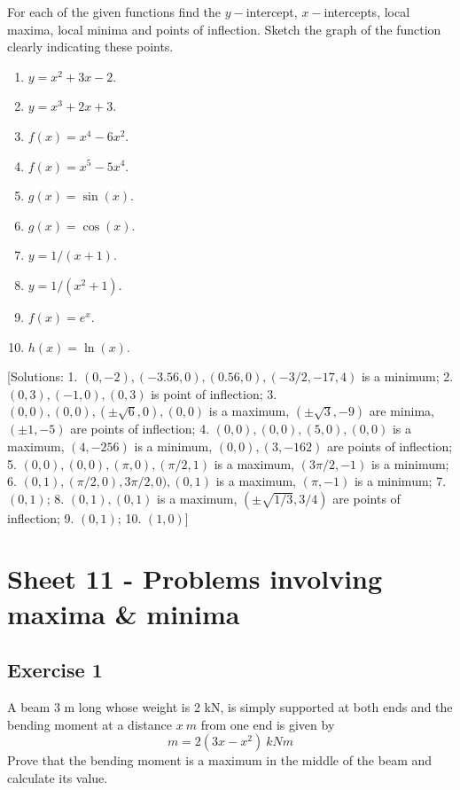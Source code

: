 \documentclass[
  11pt,
  oneside]{book}
\providecommand{\tightlist}{%
  \setlength{\itemsep}{0pt}\setlength{\parskip}{0pt}}
\newcommand{\slide}{}
\theoremstyle{definition}
\theoremstyle{definition}
\theoremstyle{definition}
\theoremstyle{definition}
\theoremstyle{remark}
\begin{document}
For each of the given functions find the \(y-\)intercept, \(x-\)intercepts, local maxima, local minima
and points of inflection. Sketch the graph of the function clearly indicating these points.

\begin{enumerate}
\def\labelenumi{\arabic{enumi}.}
\tightlist
\item
  \(y=x^2+3x-2\).
\item
  \(y=x^3+2x+3\).
\item
  \(f(x)=x^4-6x^2\).
\item
  \(f(x)=x^5-5x^4\).
\item
  \(g(x)=\sin(x)\).
\item
  \(g(x)=\cos(x)\).
\item
  \(y=1/(x+1)\).
\item
  \(y=1/(x^2+1)\).
\item
  \(f(x)=e^x\).
\item
  \(h(x)=\ln(x)\).
\end{enumerate}

{[}Solutions: 1. \((0,-2), (-3.56,0), (0.56,0), (-3/2,-17,4)\) is a minimum; 2. \((0,3), (-1,0), (0,3)\) is point of inflection; 3. \((0,0), (0,0), (\pm\sqrt{6},0), (0,0)\) is a maximum, \((\pm\sqrt{3},-9)\) are minima, \((\pm 1,-5)\) are points of inflection; 4. \((0,0), (0,0), (5,0), (0,0)\) is a maximum, \((4,-256)\) is a minimum, \((0,0), (3,-162)\) are points of inflection; 5. \((0,0), (0,0), (\pi,0), (\pi/2,1)\) is a maximum, \((3\pi/2,-1)\) is a minimum; 6. \((0,1), (\pi/2,0), 3\pi/2,0), (0,1)\) is a maximum, \((\pi,-1)\) is a minimum; 7. \((0,1)\); 8. \((0,1), (0,1)\) is a maximum, \((\pm\sqrt{1/3},3/4)\) are points of inflection; 9. \((0,1)\); 10. \((1,0)\){]}
\slide

\section{Sheet 11 - Problems involving maxima \& minima}\label{sheet-11---problems-involving-maxima-minima}

\subsection*{Exercise 1}\label{exercise-1-4}

A beam 3 m long whose weight is 2 kN, is simply supported at both ends and the bending moment at a distance \(x\ m\) from one end is given by
\[
m = 2(3x - x^2)\ kNm
\]
Prove that the bending moment is a maximum in the middle of the beam and calculate its value.
\end{document}
